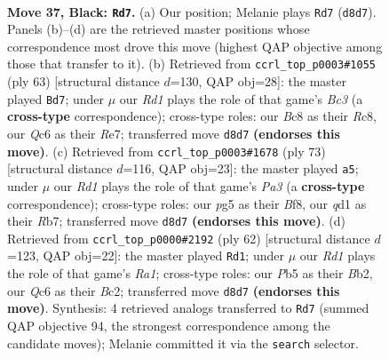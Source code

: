\documentclass[11pt]{article}
\begin{document}
\clearpage

\begin{figure}[p]\centering
\begin{subfigure}{0.46\textwidth}\centering
\resizebox{\linewidth}{!}{%
\newchessgame
\chessboard[
  setfen={2br3r/p4k1p/n1q3pP/1p1p1pP1/1b1P1P2/1P2P1K1/4N3/R2Q1BNR b - - 21 37},
  showmover=false,
  pgfstyle=straightmove, color=movearrow, markmove={d8-d7}
]}
\caption{}
\end{subfigure}\hfill
\begin{subfigure}{0.46\textwidth}\centering
\resizebox{\linewidth}{!}{%
\newchessgame
\chessboard[
  setfen={2r3k1/4rp2/1qbpnbp1/1p5p/1P2Pp2/R1PQ1N1P/B2N1PP1/4R1K1 b - - 9 32},
  showmover=false,
  pgfstyle=straightmove, color=movearrow, markmove={c6-d7}
]}
\caption{}
\end{subfigure}
\\[4pt]
\begin{subfigure}{0.46\textwidth}\centering
\resizebox{\linewidth}{!}{%
\newchessgame
\chessboard[
  setfen={1r3bk1/1r3p2/pq1ppP1p/6pP/b1p1P1P1/P1P1N3/1P1RR3/K1Q2N2 b - - 4 37},
  showmover=false,
  pgfstyle=straightmove, color=movearrow, markmove={a6-a5}
]}
\caption{}
\end{subfigure}\hfill
\begin{subfigure}{0.46\textwidth}\centering
\resizebox{\linewidth}{!}{%
\newchessgame
\chessboard[
  setfen={6k1/2prqpp1/1p3nn1/p3p2p/P3P3/1PP3Pb/1BB1QP1P/R3N1K1 w - - 0 32},
  showmover=false,
  pgfstyle=straightmove, color=movearrow, markmove={a1-d1}
]}
\caption{}
\end{subfigure}
\caption{\textbf{Move 37, Black: \texttt{Rd7}.} (a) Our position; Melanie plays \texttt{Rd7} (\texttt{d8d7}). Panels (b)--(d) are the retrieved master positions whose correspondence most drove this move (highest QAP objective among those that transfer to it). (b) Retrieved from \texttt{ccrl\_top\_p0003\#1055} (ply 63) [structural distance $d$=130, QAP obj=28]: the master played \texttt{Bd7}; under $\mu$ our \emph{Rd1} plays the role of that game's \emph{Bc3} (a \textbf{cross-type} correspondence); cross-type roles: our \emph{B}c8 as their \emph{R}c8, our \emph{Q}c6 as their \emph{R}e7; transferred move \texttt{d8d7} \textbf{(endorses this move)}. (c) Retrieved from \texttt{ccrl\_top\_p0003\#1678} (ply 73) [structural distance $d$=116, QAP obj=23]: the master played \texttt{a5}; under $\mu$ our \emph{Rd1} plays the role of that game's \emph{Pa3} (a \textbf{cross-type} correspondence); cross-type roles: our \emph{p}g5 as their \emph{B}f8, our \emph{q}d1 as their \emph{R}b7; transferred move \texttt{d8d7} \textbf{(endorses this move)}. (d) Retrieved from \texttt{ccrl\_top\_p0000\#2192} (ply 62) [structural distance $d$=123, QAP obj=22]: the master played \texttt{Rd1}; under $\mu$ our \emph{Rd1} plays the role of that game's \emph{Ra1}; cross-type roles: our \emph{P}b5 as their \emph{B}b2, our \emph{Q}c6 as their \emph{B}c2; transferred move \texttt{d8d7} \textbf{(endorses this move)}. Synthesis: 4 retrieved analogs transferred to \texttt{Rd7} (summed QAP objective 94, the strongest correspondence among the candidate moves); Melanie committed it via the \texttt{search} selector.}
\label{fig:thought-m73}
\end{figure}
\end{document}
